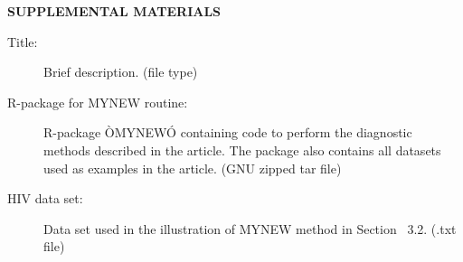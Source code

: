 \documentclass[12pt]{article}
\begin{document}
  
  \bigskip
  \begin{center}
  {\large\bf SUPPLEMENTAL MATERIALS}
  \end{center}
  
  \begin{description}
  
  \item[Title:] Brief description. (file type)
  
  \item[R-package for  MYNEW routine:] R-package ÒMYNEWÓ containing code to perform the diagnostic methods described in the article. The package also contains all datasets used as examples in the article. (GNU zipped tar file)
  
  \item[HIV data set:] Data set used in the illustration of MYNEW method in Section~ 3.2. (.txt file)
  
  \end{description}
  
  
  
  
\end{document}

